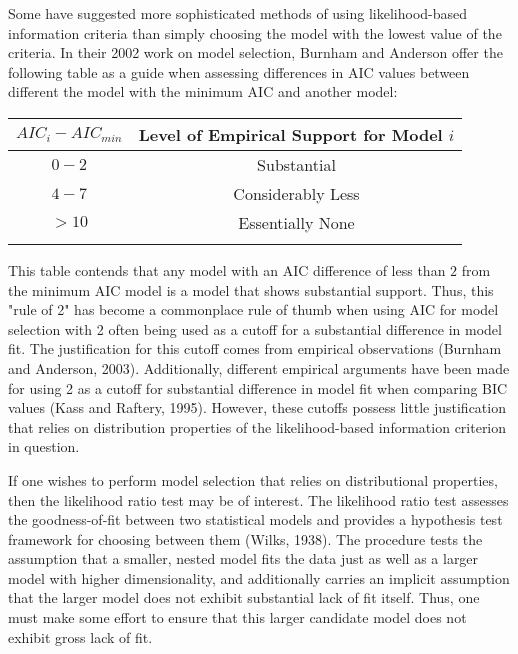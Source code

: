 		Some have suggested more sophisticated methods of using likelihood-based information criteria than simply choosing the model with the lowest value of the criteria. In their 2002 work on 
		model selection, Burnham and Anderson offer the following table as a guide when assessing differences in AIC values between different the model with the minimum AIC and another model:
		\pagebreak

		\begin{table}[h]
		\centering
		{
		\begin{tabular}{ c|c}
		$AIC_{i}-AIC_{min}$ & Level of Empirical Support for Model $i$\\
		 \hline
		 $0 - 2$ & Substantial\\
		 $4 - 7$ & Considerably Less\\
		 $> 10$ & Essentially None\\
		 \Xhline{3\arrayrulewidth}
		\end{tabular}
		}
		\end{table}	
		
		This table contends that any model with an AIC difference of less than $2$ from the minimum AIC model is a model that shows substantial support. Thus, this "rule of 2" has become a
		commonplace rule of thumb when using AIC for model selection with 2 often being used as a cutoff for a substantial difference in model fit. The justification for this cutoff comes
		from empirical observations (Burnham and Anderson, 2003). Additionally, different empirical arguments have been made for using 2 as a cutoff for substantial difference in model fit
		when comparing BIC values (Kass and Raftery, 1995). However, these cutoffs possess little justification that relies on distribution properties of the likelihood-based information
		criterion in question.

		If one wishes to perform model selection that relies on distributional properties, then the likelihood ratio test may be of interest. The likelihood ratio test assesses the
		goodness-of-fit between two statistical models and provides a hypothesis test framework for choosing between them (Wilks, 1938). The procedure tests the assumption that
		a smaller, nested model fits the data just as well as a larger model with higher dimensionality, and additionally carries an implicit assumption that the larger model does
		not exhibit substantial lack of fit itself. Thus, one must make some effort to ensure that this larger candidate model does not exhibit gross lack of fit.

